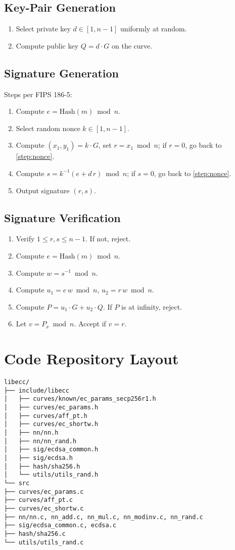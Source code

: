 \documentclass[12pt,a4paper]{article}
\begin{document}
	\subsection{Key-Pair Generation}
	\begin{enumerate}
		\item Select private key $d \in [1,n-1]$ uniformly at random.
		\item Compute public key $Q = d\cdot G$ on the curve.
	\end{enumerate}
	
	\subsection{Signature Generation}
	Steps per FIPS 186-5:
	\begin{enumerate}
		\item Compute $e = \mathrm{Hash}(m) \bmod n$.\label{step:hash}
		\item Select random nonce $k \in [1,n-1]$.\label{step:nonce}
		\item Compute $(x_1,y_1) = k\cdot G$, set $r = x_1 \bmod n$; if $r=0$, go back to \ref{step:nonce}.\label{step:r}
		\item Compute $s = k^{-1}(e + d\,r) \bmod n$; if $s=0$, go back to \ref{step:nonce}.\label{step:s}
		\item Output signature $(r,s)$.
	\end{enumerate}
	
	\subsection{Signature Verification}
	\begin{enumerate}
		\item Verify $1 \le r,s \le n-1$. If not, reject.\label{step:verify1}
		\item Compute $e = \mathrm{Hash}(m) \bmod n$.\label{step:verify2}
		\item Compute $w = s^{-1} \bmod n$.\label{step:verify3}
		\item Compute $u_1 = e\,w \bmod n$, $u_2 = r\,w \bmod n$.\label{step:verify4}
		\item Compute $P = u_1\cdot G + u_2\cdot Q$. If $P$ is at infinity, reject.\label{step:verify5}
		\item Let $v = P_x \bmod n$. Accept if $v = r$.\label{step:verify6}
	\end{enumerate}
	
	\section{Code Repository Layout}
\begin{lstlisting}
libecc/
├── include/libecc
│   ├── curves/known/ec_params_secp256r1.h
│   ├── curves/ec_params.h
│   ├── curves/aff_pt.h
│   ├── curves/ec_shortw.h
│   ├── nn/nn.h
│   ├── nn/nn_rand.h
│   ├── sig/ecdsa_common.h
│   ├── sig/ecdsa.h
│   ├── hash/sha256.h
│   └── utils/utils_rand.h
└── src
├── curves/ec_params.c
├── curves/aff_pt.c
├── curves/ec_shortw.c
├── nn/nn.c, nn_add.c, nn_mul.c, nn_modinv.c, nn_rand.c
├── sig/ecdsa_common.c, ecdsa.c
├── hash/sha256.c
└── utils/utils_rand.c
\end{lstlisting}
	
\end{document}
